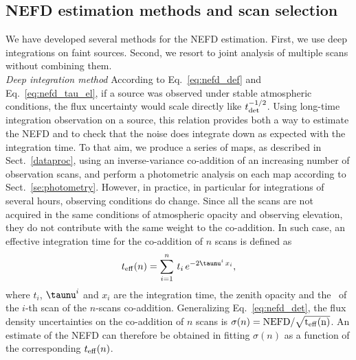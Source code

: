 \subsection{NEFD estimation methods and scan selection}
\label{se:nefd_method}

We have developed several methods for the NEFD estimation. First,
we use deep integrations on faint sources. Second, we resort to joint
analysis of multiple scans without combining them.\\



\noindent \emph{Deep integration method}
According to Eq.~\ref{eq:nefd_def} and Eq.~\ref{eq:nefd_tau_el}, if a
source was observed under stable atmospheric conditions, the flux
uncertainty would scale directly like
$t_{\rm{det}}^{-1/2}$. Using long-time integration observation on a
source, this relation provides both a way to estimate the NEFD and to
check that the noise does integrate down as expected with the integration
time. To that aim, we produce a series of maps, as described in Sect.~\ref{dataproc},
using an inverse-variance co-addition of an increasing number of observation
scans, and perform a photometric analysis on each map according to
Sect.~\ref{se:photometry}. However, in practice, in particular for
integrations of several hours, observing conditions do change.
Since all the scans are not acquired in the same conditions of
atmospheric opacity and observing elevation, they
do not contribute with the same weight to the co-addition. In such
case, an effective integration time for the co-addition of $n$ scans
is defined as
%
\begin{equation}
t_{\rm{eff}}(n) = \sum_{i=1}^{n}\, t_i\,  e^{-2\taunu^i\, x_i},
\label{eq:sigma_tau_w8}
\end{equation}
%
where $t_i$, $\taunu^i$ and $x_i$ are the integration time, the zenith
opacity and the \airmass\ of the $i$-th scan of the $n$-scans
co-addition.
Generalizing Eq.~\ref{eq:nefd_det}, the flux density uncertainties on
the co-addition of $n$ scans is $\sigma(n) = \rm{NEFD}/\sqrt{t_{\rm{eff}}(n)}$.
An estimate of the
NEFD can therefore be obtained in fitting
$\sigma(n)$ as a function of the corresponding $t_{\rm{eff}}(n)$.\\
%
%
%


